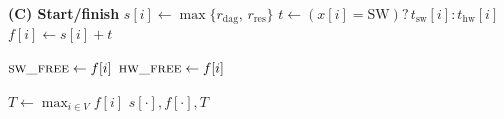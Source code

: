 \begin{algorithm}[!htbp]
\begin{algorithmic}[1]
    \Statex \textbf{(C) Start/finish}
    \State $s[i]\gets \max\{r_{\mathrm{dag}},\, r_{\mathrm{res}}\}$
    \State $t\gets (x[i]=\mathrm{SW})?\,t_{\mathrm{sw}}[i]:t_{\mathrm{hw}}[i]$
    \State $f[i]\gets s[i]+t$

        \State $\textsc{sw\_free}\gets f[i]$ 
    \EndIf
        \State $\textsc{hw\_free}\gets f[i]$ 
    \EndIf
\EndFor

\State $T\gets \max_{i\in V} f[i]$
\State \Return $s[\cdot], f[\cdot], T$
\end{algorithmic}
\end{algorithm}


